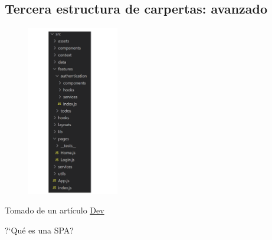\subsection{Tercera estructura de carpertas: avanzado}

\begin{figure}[h]
  \center
  \begin{minipage}{5cm}
    \includegraphics[width=4cm]{Develop/Languages/JavaScript/Frameworks/React/images/FolderAvantageReact.png}
  \end{minipage}
\end{figure}



Tomado de un art\'iculo  \href{https://dev.to/fpaghar/folder-structuring-techniques-for-beginner-to-advanced-react-projects-30d7}{\blue Dev}


?`Qu\'e es una SPA?

